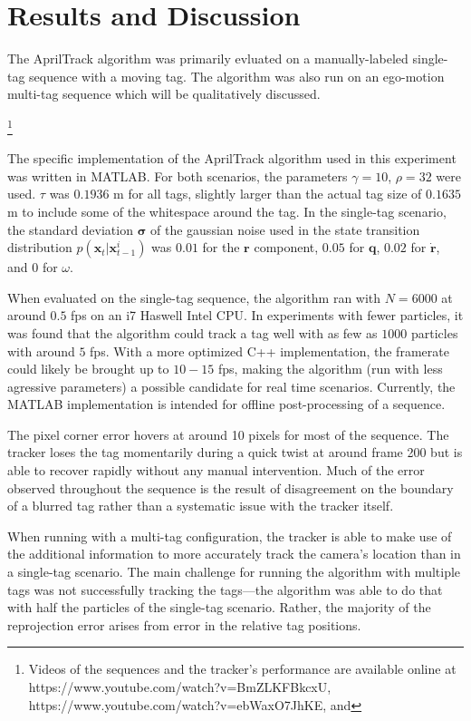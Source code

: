 \documentclass[letterpaper, 10 pt, conference]{ieeeconf}
\renewcommand{\vec}[1]{\boldsymbol{#1}}
\begin{document}
\section{Results and Discussion}

The AprilTrack algorithm was primarily evluated on a manually-labeled single-tag sequence with a moving tag. The algorithm was also run on an ego-motion multi-tag sequence which will be qualitatively discussed.

\footnote{Videos of the sequences and the tracker's performance are available online at https://www.youtube.com/watch?v=BmZLKFBkcxU, https://www.youtube.com/watch?v=ebWaxO7JhKE, and }


The specific implementation of the AprilTrack algorithm used in this experiment was written in MATLAB. For both scenarios, the parameters $\gamma = 10$, $\rho=32$ were used. $\tau$ was $0.1936$ m for all tags, slightly larger than the actual tag size of $0.1635$ m to include some of the whitespace around the tag. In the single-tag scenario, the standard deviation $\vec{\sigma}$  of the gaussian noise used in the state transition distribution $p(\vec{x}_t|\vec{x}^i_{t-1})$ was $0.01$ for the $\vec{r}$ component, $0.05$ for $\vec{q}$, $0.02$ for $\dot{\vec{r}}$, and $0$ for $\omega$.


When evaluated on the single-tag sequence, the algorithm ran with $N=6000$ at around $0.5$ fps on an i7 Haswell Intel CPU. In experiments with fewer particles, it was found that the algorithm could track a tag well with as few as $1000$ particles with around $5$ fps. With a more optimized C++ implementation, the framerate could likely be brought up to $10-15$ fps, making the algorithm (run with less agressive parameters) a possible candidate for real time scenarios. Currently, the MATLAB implementation is intended for offline post-processing of a sequence.


The pixel corner error hovers at around 10 pixels for most of the sequence. The tracker loses the tag momentarily during a quick twist at around frame 200 but is able to recover rapidly without any manual intervention. Much of the error observed throughout the sequence is the result of disagreement on the boundary of a blurred tag rather than a systematic issue with the tracker itself.

When running with a multi-tag configuration, the tracker is able to make use of the additional information to more accurately track the camera's location than in a single-tag scenario. The main challenge for running the algorithm with multiple tags was not successfully tracking the tags---the algorithm was able to do that with half the particles of the single-tag scenario. Rather, the majority of the reprojection error arises from error in the relative tag positions.
\end{document}
